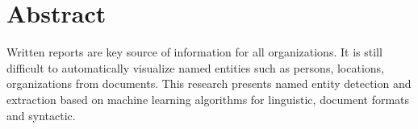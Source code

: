 \chapter*{Abstract} 
Written reports are key source of information for all organizations. It is still difficult to automatically visualize named  entities such as persons, locations, organizations  from documents.
This research presents named entity detection and  extraction based on machine learning algorithms for linguistic, document formats and syntactic.

